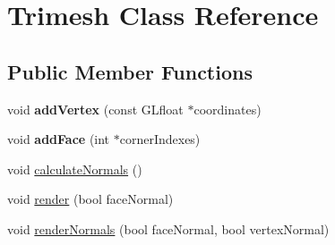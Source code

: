 \hypertarget{classTrimesh}{\section{Trimesh Class Reference}
\label{classTrimesh}
}
\subsection*{Public Member Functions}
\begin{DoxyCompactItemize}
\item 
\hypertarget{classTrimesh_aee77f52567186fe071be314368a95a17}{void {\bfseries add\-Vertex} (const G\-Lfloat $\ast$coordinates)}\label{classTrimesh_aee77f52567186fe071be314368a95a17}

\item 
\hypertarget{classTrimesh_a38056e42e653cc58dcbd52f43db0ca75}{void {\bfseries add\-Face} (int $\ast$corner\-Indexes)}\label{classTrimesh_a38056e42e653cc58dcbd52f43db0ca75}

\item 
void \hyperlink{classTrimesh_aac7027d5aeb0af14e4503791e13d84fe}{calculate\-Normals} ()
\item 
void \hyperlink{classTrimesh_a817f3ec53aa8f052dcdb8c0cc54b0c4d}{render} (bool face\-Normal)
\item 
void \hyperlink{classTrimesh_ab05eecb8be123c1d1e65b94831a4c264}{render\-Normals} (bool face\-Normal, bool vertex\-Normal)
\end{DoxyCompactItemize}


